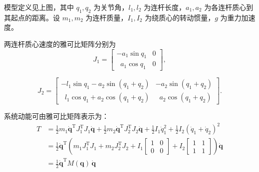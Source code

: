 \documentclass{ctexart}
\newcommand{\TT}{\mathrm{T}}
\begin{document}
\begin{center}
\end{center}

模型定义见上图，其中 $q_1, q_2$ 为关节角，$l_1, l_2$ 为连杆长度，$a_1, a_2$ 为各连杆质心到其起点的距离。设 $m_1, m_2$ 为连杆质量，$I_1, I_2$ 为绕质心的转动惯量，$g$ 为重力加速度。

两连杆质心速度的雅可比矩阵分别为
\[
    J_1 =
    \begin{bmatrix}
        - a_1 \sin q_1    & 0 \\
        \;\; a_1 \cos q_1 & 0
    \end{bmatrix},
\]

\[
    J_2 =
    \begin{bmatrix}
        - l_1 \sin q_1 - a_2 \sin(q_1 + q_2)    & - a_2 \sin(q_1 + q_2)    \\
        \;\; l_1 \cos q_1 + a_2 \cos(q_1 + q_2) & \;\; a_2 \cos(q_1 + q_2)
    \end{bmatrix}.
\]

系统动能可由雅可比矩阵表示为：
\begin{align*}
    T & =
    \frac{1}{2} m_1 \dot{\boldsymbol q}^\TT J_1^\TT J_1 \dot{\boldsymbol q}
    + \frac{1}{2} m_2 \dot{\boldsymbol q}^\TT J_2^\TT J_2 \dot{\boldsymbol q}
    + \frac{1}{2} I_1 \dot{q}_1^2
    + \frac{1}{2} I_2 (\dot{q}_1 + \dot{q}_2)^2                                            \\
      & = \frac{1}{2}\dot{\boldsymbol q}^\TT \left(m_1 J_1^\TT J_1 + m_2 J_2^\TT J_2 + I_1
    \begin{bmatrix}
            1 & 0 \\
            0 & 0
        \end{bmatrix}
    + I_2
    \begin{bmatrix}
            1 & 1 \\
            1 & 1
        \end{bmatrix}\right) \dot{\boldsymbol q}                                               \\
      & = \frac{1}{2} \dot{\boldsymbol q}^\TT M(\boldsymbol q)\, \dot{\boldsymbol q}
\end{align*}
\end{document}
